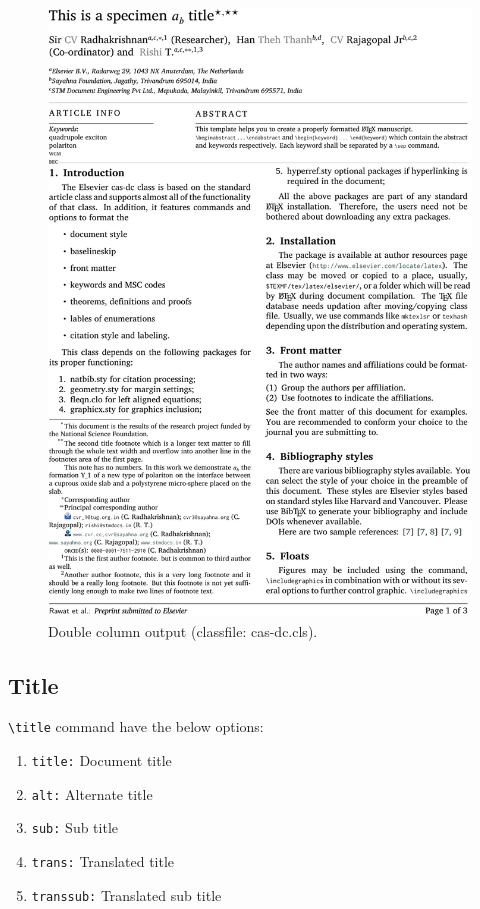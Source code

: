 \documentclass[a4paper,12pt]{article}
\begin{document}
\begin{figure}
\includegraphics[width=\textwidth]{dc-sample.pdf}
\caption{Double column output (classfile: cas-dc.cls).}
\end{figure}

\subsection{Title}

\verb+\title+ command have the below options:
\begin{enumerate}
\item \verb+title:+ Document title
\item \verb+alt:+ Alternate title
\item \verb+sub:+ Sub title
\item \verb+trans:+ Translated title
\item \verb+transsub:+ Translated sub title
\end{enumerate}
\end{document}
